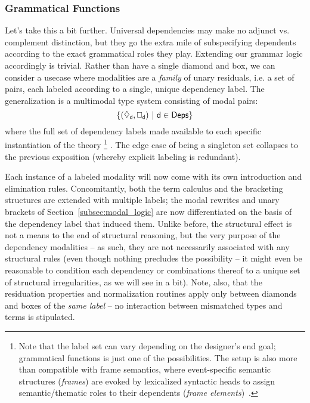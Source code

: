 \subsubsection{Grammatical Functions}
Let's take this a bit further.
Universal dependencies may make no adjunct vs. complement distinction, but they go the extra mile of subspecifying dependents according to the exact grammatical roles they play.
Extending our grammar logic accordingly is trivial.
Rather than have a single diamond and box, we can consider a usecase where modalities are a \textit{family} of unary residuals, i.e. a set of pairs, each labeled according to a single, unique dependency label.
The generalization is a multimodal type system consisting of modal pairs:
\begin{equation}
\{(\ddia{d}, \dbox{d}) \ | \ {\dep{d} \in \deps} \} 
\end{equation}
where \deps{} the full set of dependency labels made available to each specific instantiation of the theory%
\footnote{Note that the label set can vary depending on the designer's end goal; grammatical functions is just one of the possibilities.
	The setup is also more than compatible with frame semantics, where event-specific semantic structures (\textit{frames}) are evoked by lexicalized syntactic heads to assign semantic/thematic roles to their dependents (\textit{frame elements})~\cite{fillmore1976frame}.}%
.
The edge case of \deps{} being a singleton set collapses to the previous exposition (whereby explicit labeling is redundant).

Each instance of a labeled modality will now come with its own introduction and elimination rules.
Concomitantly, both the term calculus and the bracketing structures are extended with multiple labels; the modal rewrites and unary brackets of Section~\ref{subsec:modal_logic} are now differentiated on the basis of the dependency label that induced them.
Unlike before, the structural effect is not a means to the end of structural reasoning, but the very purpose of the dependency modalities -- as such, they are not necessarily associated with any structural rules (even though nothing precludes the possibility -- it might even be reasonable to condition each dependency or combinations thereof to a unique set of structural irregularities, as we will see in a bit).
Note, also, that the residuation properties and normalization routines apply only between diamonds and boxes of the \textit{same label} -- no interaction between mismatched types and terms is stipulated.


